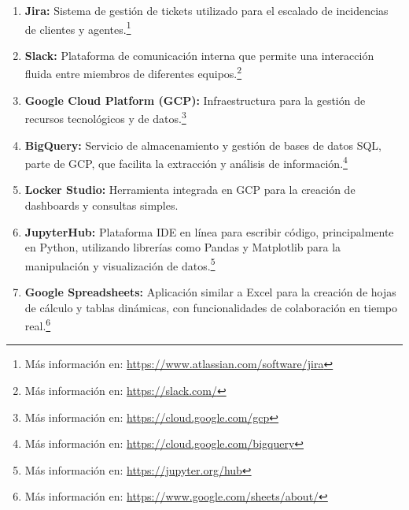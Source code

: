 \begin{enumerate}
  \item \textbf{Jira:} Sistema de gestión de tickets utilizado para el escalado de incidencias de clientes y agentes.\footnote{Más información en: \url{https://www.atlassian.com/software/jira}}
  \item \textbf{Slack:} Plataforma de comunicación interna que permite una interacción fluida entre miembros de diferentes equipos.\footnote{Más información en: \url{https://slack.com/}}
  \item \textbf{Google Cloud Platform (GCP):} Infraestructura para la gestión de recursos tecnológicos y de datos.\footnote{Más información en: \url{https://cloud.google.com/gcp}}
  \item \textbf{BigQuery:} Servicio de almacenamiento y gestión de bases de datos SQL, parte de GCP, que facilita la extracción y análisis de información.\footnote{Más información en: \url{https://cloud.google.com/bigquery}}
  \item \textbf{Locker Studio:} Herramienta integrada en GCP para la creación de dashboards y consultas simples.
  \item \textbf{JupyterHub:} Plataforma IDE en línea para escribir código, principalmente en Python, utilizando librerías como Pandas y Matplotlib para la manipulación y visualización de datos.\footnote{Más información en: \url{https://jupyter.org/hub}}
  \item \textbf{Google Spreadsheets:} Aplicación similar a Excel para la creación de hojas de cálculo y tablas dinámicas, con funcionalidades de colaboración en tiempo real.\footnote{Más información en: \url{https://www.google.com/sheets/about/}}
\end{enumerate}
